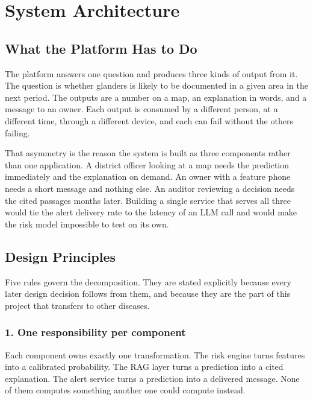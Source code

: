 \documentclass[10pt,openany]{report}
\begin{document}
\chapter{System Architecture}
\label{ch:arch}

\section{What the Platform Has to Do}

The platform answers one question and produces three kinds of output from it. The question is
whether glanders is likely to be documented in a given area in the next period. The outputs are a
number on a map, an explanation in words, and a message to an owner. Each output is consumed by a
different person, at a different time, through a different device, and each can fail without the
others failing.

That asymmetry is the reason the system is built as three components rather than one application.
A district officer looking at a map needs the prediction immediately and the explanation on
demand. An owner with a feature phone needs a short message and nothing else. An auditor
reviewing a decision needs the cited passages months later. Building a single service that serves
all three would tie the alert delivery rate to the latency of an LLM call and would make the risk
model impossible to test on its own.



\section{Design Principles}

Five rules govern the decomposition. They are stated explicitly because every later design
decision follows from them, and because they are the part of this project that transfers to other
diseases.

\subsection*{1. One responsibility per component}

Each component owns exactly one transformation. The risk engine turns features into a calibrated
probability. The RAG layer turns a prediction into a cited explanation. The alert service turns a
prediction into a delivered message. None of them computes something another one could compute
instead.
\end{document}
